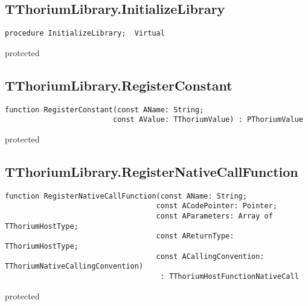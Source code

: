 \subsection{TThoriumLibrary.InitializeLibrary}
\label{thoriumcore:thorium:tthoriumlibrary:initializelibrary}
\begin{FPCList}
\Synopsis
\Declaration 

\begin{verbatim}
procedure InitializeLibrary;  Virtual
\end{verbatim}
\Visibility
protected
\Description
\Errors
\end{FPCList}
\subsection{TThoriumLibrary.RegisterConstant}
\label{thoriumcore:thorium:tthoriumlibrary:registerconstant}
\begin{FPCList}
\Synopsis
\Declaration 

\begin{verbatim}
function RegisterConstant(const AName: String;
                         const AValue: TThoriumValue) : PThoriumValue
\end{verbatim}
\Visibility
protected
\Description
\Errors
\end{FPCList}
\subsection{TThoriumLibrary.RegisterNativeCallFunction}
\label{thoriumcore:thorium:tthoriumlibrary:registernativecallfunction}
\begin{FPCList}
\Synopsis
\Declaration 

\begin{verbatim}
function RegisterNativeCallFunction(const AName: String;
                                   const ACodePointer: Pointer;
                                   const AParameters: Array of TThoriumHostType;
                                   const AReturnType: TThoriumHostType;
                                   const ACallingConvention: TThoriumNativeCallingConvention)
                                    : TThoriumHostFunctionNativeCall
\end{verbatim}
\Visibility
protected
\Description
\Errors
\end{FPCList}
